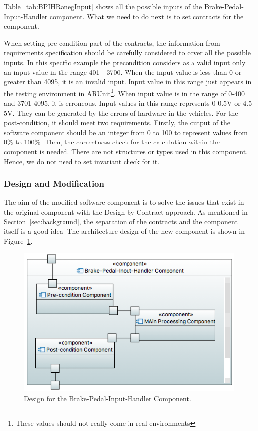 Table~\ref{tab:BPIHRanegInput} shows all the possible inputs of the Brake-Pedal-Input-Handler component. What we need to do next is to set contracts for the component. %

When setting pre-condition part of the contracts, the information from requirements specification should be carefully considered to cover all the possible inputs. In this specific example the precondition considers as a valid input only an input value in the range 401 - 3700. 
When the input value is less than 0 or greater than 4095, it is an invalid input. Input value in this range just appears in the testing environment in ARUnit\footnote{These values should not really come in real environments}. When input value is in the range of  0-400 and 3701-4095, it is erroneous. Input values in this range represents 0-0.5V or 4.5-5V. They can be generated by the errors of hardware in the vehicles. For the post-condition, it should meet two requirements. Firstly, the output of the software component should be an integer from 0 to 100 to represent values from 0\% to 100\%. Then, the correctness check for the calculation within the component is needed. There are not structures or types used in this component. Hence, we do not need to set invariant check for it.


\subsubsection{Design and Modification}

The aim of the modified software component is to solve the issues that exist in the original component with the Design by Contract approach. As mentioned in Section~\ref{sec:background}, the separation of the contracts and the component itself is a good idea. The architecture design of the new component is shown in Figure~\ref{fig:BrakePedalComponent}. 

\begin{figure}[htb]
\centering
\includegraphics[width=.8\columnwidth]{figure/component222.png}
\caption{Design for the Brake-Pedal-Input-Handler Component.}
\label{fig:BrakePedalComponent}
\end{figure}

